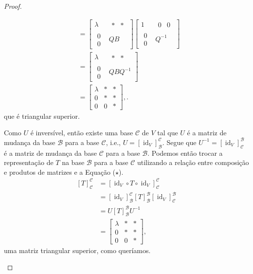 \begin{proof}
\begin{itemize}
\begin{align*}
			&=\begin{bmatrix}\lambda&\begin{matrix}\ast&\ast\end{matrix}\\\begin{matrix}0\\0\end{matrix}&QB\end{bmatrix}\begin{bmatrix}1&\begin{matrix}0&0\end{matrix}\\\begin{matrix}0\\0\end{matrix}&Q^{-1}\end{bmatrix}\\
			&=\begin{bmatrix}\lambda&\begin{matrix}\ast&\ast\end{matrix}\\\begin{matrix}0\\0\end{matrix}&QBQ^{-1}\end{bmatrix}\\
			&=\begin{bmatrix}\lambda&\ast&\ast\\0&\ast&\ast\\0&0&\ast\end{bmatrix},\tag{$\star$}.
	\end{align*}
	que é triangular superior.
	
	Como $U$ é inversível, então existe uma base $\mathcal{C}$ de $V$ tal que $U$ é a matriz de mudança da base $\mathcal{B}$ para a base $\mathcal{C}$, i.e., $U=\left[\operatorname{id}_V\right]_{\mathcal{B}}^{\mathcal{C}}$. Segue que $U^{-1}=\left[\operatorname{id}_V\right]_{\mathcal{C}}^{\mathcal{B}}$ é a matriz de mudança da base $\mathcal{C}$ para a base $\mathcal{B}$. Podemos então trocar a representação de $T$ na base $\mathcal{B}$ para a base $\mathcal{C}$ utilizando a relação entre composição e produtos de matrizes e a Equação ($\star$).
	\begin{align*}
	    \left[T\right]_{\mathcal{C}}^{\mathcal{C}}
	        &=\left[\operatorname{id}_V\circ T\circ\operatorname{id}_V\right]_{\mathcal{C}}^{\mathcal{C}}\\
	        &=\left[\operatorname{id}_V\right]_{\mathcal{B}}^{\mathcal{C}}\left[T\right]_{\mathcal{B}}^{\mathcal{B}}\left[\operatorname{id}_V\right]_{\mathcal{C}}^{\mathcal{B}}\\
	        &=U\left[T\right]_{\mathcal{B}}^{\mathcal{B}}U^{-1}\\
	        &=\begin{bmatrix}\lambda&\ast&\ast\\0&\ast&\ast\\0&0&\ast\end{bmatrix},
	\end{align*}
	uma matriz triangular superior, como queríamos.
	

\end{itemize}
\end{proof}
